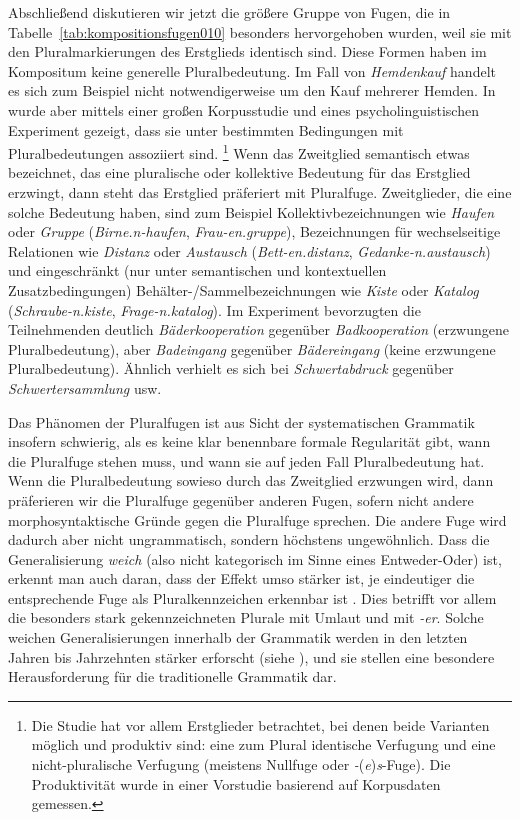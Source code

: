 Abschließend diskutieren wir jetzt die größere Gruppe von Fugen, die in Tabelle~\ref{tab:kompositionsfugen010} besonders hervorgehoben wurden, weil sie mit den Pluralmarkierungen des Erstglieds identisch sind.
Diese Formen haben im Kompositum keine generelle Pluralbedeutung.
Im Fall von \textit{Hemdenkauf} handelt es sich zum Beispiel nicht notwendigerweise um den Kauf mehrerer Hemden.
In \citet{SchaeferPankratz2018} wurde aber mittels einer großen Korpusstudie und eines psycholinguistischen Experiment gezeigt, dass sie unter bestimmten Bedingungen mit Pluralbedeutungen assoziiert sind.%
\footnote{Die Studie hat vor allem Erstglieder betrachtet, bei denen beide Varianten möglich und produktiv sind:
eine zum Plural identische Verfugung und eine nicht-pluralische Verfugung (meistens Nullfuge oder \textit{-}(\textit{e})\textit{s}-Fuge).
Die Produktivität wurde in einer Vorstudie basierend auf Korpusdaten gemessen.}
Wenn das Zweitglied semantisch etwas bezeichnet, das eine pluralische oder kollektive Bedeutung für das Erstglied erzwingt, dann steht das Erstglied präferiert mit Pluralfuge.
Zweitglieder, die eine solche Bedeutung haben, sind zum Beispiel Kollektivbezeichnungen wie \textit{Haufen} oder \textit{Gruppe} (\zB \textit{Birne.n-haufen}, \textit{Frau-en.gruppe}), Bezeichnungen für wechselseitige Relationen wie \textit{Distanz} oder \textit{Austausch} (\zB \textit{Bett-en.distanz}, \textit{Gedanke-n.austausch}) und eingeschränkt (nur unter semantischen und kontextuellen Zusatzbedingungen) Behälter-\slash Sammelbezeichnungen wie \textit{Kiste} oder \textit{Katalog} (\zB \textit{Schraube-n.kiste}, \textit{Frage-n.katalog}).
Im Experiment bevorzugten die Teilnehmenden deutlich \textit{Bäderkooperation} gegenüber \textit{Badkooperation} (erzwungene Pluralbedeutung), aber \textit{Badeingang} gegenüber \textit{Bädereingang} (keine erzwungene Pluralbedeutung).
Ähnlich verhielt es sich bei \textit{Schwertabdruck} gegenüber \textit{Schwertersammlung} usw.

Das Phänomen der Pluralfugen ist aus Sicht der systematischen Grammatik insofern schwierig, als es keine klar benennbare formale Regularität gibt, wann die Pluralfuge stehen muss, und wann sie auf jeden Fall Pluralbedeutung hat.
Wenn die Pluralbedeutung sowieso durch das Zweitglied erzwungen wird, dann präferieren wir die Pluralfuge gegenüber anderen Fugen, sofern nicht andere morphosyntaktische Gründe gegen die Pluralfuge sprechen.
Die andere Fuge wird dadurch aber nicht ungrammatisch, sondern höchstens ungewöhnlich.
Dass die Generalisierung \textit{weich}\label{abs:weich} (also nicht kategorisch im Sinne eines Entweder-Oder) ist, erkennt man auch daran, dass der Effekt umso stärker ist, je eindeutiger die entsprechende Fuge als Pluralkennzeichen erkennbar ist \citep{SchaeferPankratz2018}.
Dies betrifft vor allem die besonders stark gekennzeichneten Plurale mit Umlaut und mit \textit{-er}.
Solche weichen Generalisierungen innerhalb der Grammatik werden in den letzten Jahren bis Jahrzehnten stärker erforscht (siehe \citealt{Schaefer2018a}), und sie stellen eine besondere Herausforderung für die traditionelle Grammatik dar.

